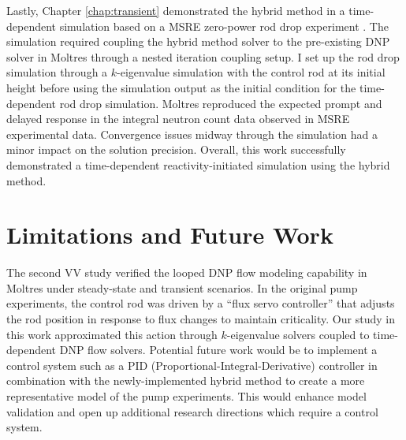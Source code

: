 Lastly, Chapter \ref{chap:transient} demonstrated the hybrid method in a time-dependent simulation
based on a \gls{MSRE} zero-power rod drop experiment \cite{prince_zero-power_1968}.
The simulation required coupling the hybrid method solver to the pre-existing \gls{DNP} solver
in Moltres through a nested iteration coupling setup.
I set up the rod drop simulation through a
$k$-eigenvalue simulation with the control rod at its initial height before using the simulation
output as the initial condition for the time-dependent rod drop simulation. Moltres reproduced the
expected prompt and delayed response in the integral neutron count data observed in \gls{MSRE}
experimental data. Convergence issues midway through the simulation had a minor impact on the
solution precision. Overall, this work successfully demonstrated a time-dependent
reactivity-initiated simulation using the hybrid method.

\section{Limitations and Future Work}

The second \gls{VV} study verified the looped \gls{DNP} flow modeling capability in Moltres under
steady-state and transient scenarios. In the original pump experiments, the control rod was driven
by a ``flux servo controller'' that adjusts the rod position in response to flux changes to maintain
criticality. Our study in this work approximated this action through $k$-eigenvalue solvers
coupled to time-dependent \gls{DNP} flow solvers. Potential future work would be to implement a
control system such as a PID (Proportional-Integral-Derivative) controller in combination with
the newly-implemented hybrid method to create a more representative model of the pump experiments.
This would enhance model validation and open up additional research directions which require a
control system.

